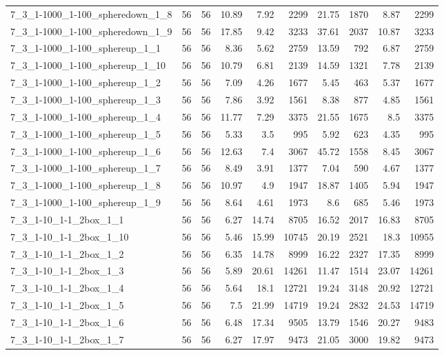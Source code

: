 \begin{center}
\begin{scriptsize}
\begin{longtable}{lrrrrrrrrr}
7\_3\_1-1000\_1-100\_spheredown\_1\_8 & 56 & 56 & 10.89 & 7.92 & 2299 & 21.75 & 1870 & 8.87 & 2299\\
7\_3\_1-1000\_1-100\_spheredown\_1\_9 & 56 & 56 & 17.85 & 9.42 & 3233 & 37.61 & 2037 & 10.87 & 3233\\
7\_3\_1-1000\_1-100\_sphereup\_1\_1 & 56 & 56 & 8.36 & 5.62 & 2759 & 13.59 & 792 & 6.87 & 2759\\
7\_3\_1-1000\_1-100\_sphereup\_1\_10 & 56 & 56 & 10.79 & 6.81 & 2139 & 14.59 & 1321 & 7.78 & 2139\\
7\_3\_1-1000\_1-100\_sphereup\_1\_2 & 56 & 56 & 7.09 & 4.26 & 1677 & 5.45 & 463 & 5.37 & 1677\\
7\_3\_1-1000\_1-100\_sphereup\_1\_3 & 56 & 56 & 7.86 & 3.92 & 1561 & 8.38 & 877 & 4.85 & 1561\\
7\_3\_1-1000\_1-100\_sphereup\_1\_4 & 56 & 56 & 11.77 & 7.29 & 3375 & 21.55 & 1675 & 8.5 & 3375\\
7\_3\_1-1000\_1-100\_sphereup\_1\_5 & 56 & 56 & 5.33 & 3.5 & 995 & 5.92 & 623 & 4.35 & 995\\
7\_3\_1-1000\_1-100\_sphereup\_1\_6 & 56 & 56 & 12.63 & 7.4 & 3067 & 45.72 & 1558 & 8.45 & 3067\\
7\_3\_1-1000\_1-100\_sphereup\_1\_7 & 56 & 56 & 8.49 & 3.91 & 1377 & 7.04 & 590 & 4.67 & 1377\\
7\_3\_1-1000\_1-100\_sphereup\_1\_8 & 56 & 56 & 10.97 & 4.9 & 1947 & 18.87 & 1405 & 5.94 & 1947\\
7\_3\_1-1000\_1-100\_sphereup\_1\_9 & 56 & 56 & 8.64 & 4.61 & 1973 & 8.6 & 685 & 5.46 & 1973\\
7\_3\_1-10\_1-1\_2box\_1\_1 & 56 & 56 & 6.27 & 14.74 & 8705 & 16.52 & 2017 & 16.83 & 8705\\
7\_3\_1-10\_1-1\_2box\_1\_10 & 56 & 56 & 5.46 & 15.99 & 10745 & 20.19 & 2521 & 18.3 & 10955\\
7\_3\_1-10\_1-1\_2box\_1\_2 & 56 & 56 & 6.35 & 14.78 & 8999 & 16.22 & 2327 & 17.35 & 8999\\
7\_3\_1-10\_1-1\_2box\_1\_3 & 56 & 56 & 5.89 & 20.61 & 14261 & 11.47 & 1514 & 23.07 & 14261\\
7\_3\_1-10\_1-1\_2box\_1\_4 & 56 & 56 & 5.64 & 18.1 & 12721 & 19.24 & 3148 & 20.92 & 12721\\
7\_3\_1-10\_1-1\_2box\_1\_5 & 56 & 56 & 7.5 & 21.99 & 14719 & 19.24 & 2832 & 24.53 & 14719\\
7\_3\_1-10\_1-1\_2box\_1\_6 & 56 & 56 & 6.48 & 17.34 & 9505 & 13.79 & 1546 & 20.27 & 9483\\
7\_3\_1-10\_1-1\_2box\_1\_7 & 56 & 56 & 6.27 & 17.97 & 9473 & 21.05 & 3000 & 19.82 & 9473\\

\end{longtable}
\end{scriptsize}
\end{center}
